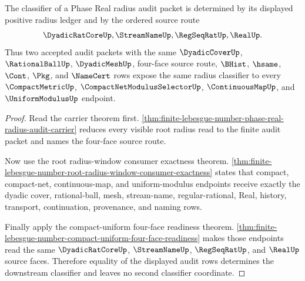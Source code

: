 \begin{theorem}
\label{thm:finite-lebesgue-number-phase-real-radius-audit-classifier}
The classifier of a Phase Real radius audit packet is determined by its displayed positive radius ledger and by the ordered source route
$$
\DyadicRatCoreUp,\StreamNameUp,\RegSeqRatUp,\RealUp .
$$
Thus two accepted audit packets with the same $\DyadicCoverUp$, $\RationalBallUp$, $\DyadicMeshUp$, four-face source route, $\BHist$, $\hsame$, $\Cont$, $\Pkg$, and $\NameCert$ rows expose the same radius classifier to every $\CompactMetricUp$, $\CompactNetModulusSelectorUp$, $\ContinuousMapUp$, and $\UniformModulusUp$ endpoint.
\end{theorem}
\begin{proof}
Read the carrier theorem first. \autoref{thm:finite-lebesgue-number-phase-real-radius-audit-carrier} reduces every visible root radius read to the finite audit packet and names the four-face source route.

Now use the root radius-window consumer exactness theorem. \autoref{thm:finite-lebesgue-number-root-radius-window-consumer-exactness} states that compact, compact-net, continuous-map, and uniform-modulus endpoints receive exactly the dyadic cover, rational-ball, mesh, stream-name, regular-rational, Real, history, transport, continuation, provenance, and naming rows.

Finally apply the compact-uniform four-face readiness theorem. \autoref{thm:finite-lebesgue-number-compact-uniform-four-face-readiness} makes those endpoints read the same $\DyadicRatCoreUp$, $\StreamNameUp$, $\RegSeqRatUp$, and $\RealUp$ source faces. Therefore equality of the displayed audit rows determines the downstream classifier and leaves no second classifier coordinate.
\end{proof}

